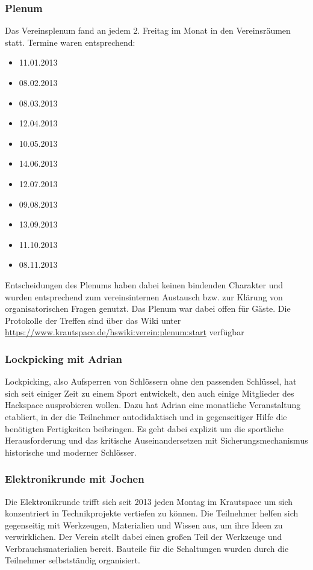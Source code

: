 \documentclass[10pt,DIV16]{scrartcl}
\begin{document}
\subsubsection{Plenum}

Das Vereinsplenum fand an jedem 2. Freitag im Monat in den
Vereinsräumen statt. Termine waren entsprechend:

\begin{itemize}
	\item 11.01.2013
	\item 08.02.2013
	\item 08.03.2013
	\item 12.04.2013
	\item 10.05.2013
	\item 14.06.2013
	\item 12.07.2013
	\item 09.08.2013
	\item 13.09.2013
	\item 11.10.2013
	\item 08.11.2013
\end{itemize}

Entscheidungen des Plenums haben dabei keinen bindenden Charakter und 
wurden entsprechend zum vereinsinternen Austausch bzw. zur Klärung von 
organisatorischen Fragen genutzt. Das Plenum war dabei offen für Gäste. 
Die Protokolle der Treffen sind über das Wiki unter 
\url{https://www.krautspace.de/hswiki:verein:plenum:start} verfügbar


\subsubsection{Lockpicking mit Adrian}

Lockpicking, also Aufsperren von Schlössern ohne den passenden 
Schlüssel, hat sich seit einiger Zeit zu einem Sport entwickelt, den 
auch einige Mitglieder des Hackspace ausprobieren wollen. Dazu hat 
Adrian eine monatliche Veranstaltung etabliert, in der die Teilnehmer 
autodidaktisch und in gegenseitiger Hilfe die benötigten Fertigkeiten 
beibringen. Es geht dabei explizit um die sportliche Herausforderung 
und das kritische Auseinandersetzen mit Sicherungsmechanismus 
historische und moderner Schlösser. 

\subsubsection{Elektronikrunde mit Jochen}

Die Elektronikrunde trifft sich seit 2013 jeden Montag im Krautspace um 
sich konzentriert in Technikprojekte vertiefen zu können. Die 
Teilnehmer helfen sich gegenseitig mit Werkzeugen, Materialien und 
Wissen aus, um ihre Ideen zu verwirklichen. Der Verein stellt dabei 
einen großen Teil der Werkzeuge und Verbrauchsmaterialien bereit. 
Bauteile für die Schaltungen wurden durch die Teilnehmer selbstständig 
organisiert.
\end{document}
